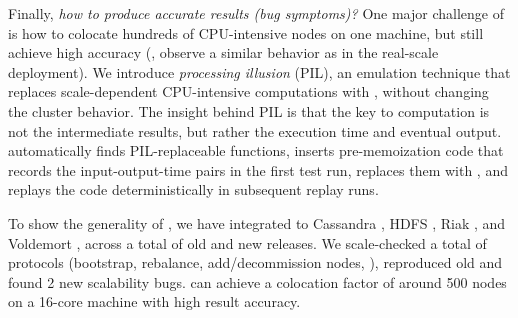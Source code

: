 Finally, {\em how to produce accurate results (bug symptoms)?}  One major
challenge of \sck is how to colocate hundreds of CPU-intensive nodes on
one machine, but still achieve high accuracy (\ie, observe a similar
behavior as in the real-scale deployment).
%
We introduce {\em processing illusion} (PIL), an emulation technique that
replaces scale-dependent CPU-intensive computations with \sleep, without
changing the cluster behavior.  The insight behind PIL is that the key to
computation is not the intermediate results, but rather the execution time
and eventual output.  \sck automatically finds PIL-replaceable functions,
inserts pre-memoization code that records the input-output-time pairs in
the first test run, replaces them with \sleep, and replays the code
deterministically in subsequent replay runs.


To show the generality of \sck, we have integrated \sck to
Cassandra \cite{Lakshman+09-Cassandra}, HDFS \cite{HDFSWeb},
Riak \cite{RiakWeb}, and Voldemort \cite{VoldemortWeb},
across a total of  \numVersTotal old and new releases.
%
We scale-checked a total of \numProt protocols (bootstrap, rebalance,
add/decommission nodes, \etc), reproduced \numEval old
and found 2 new scalability bugs.
%
\sck can achieve a colocation
factor of around 500 nodes on a 16-core machine with high result accuracy.





